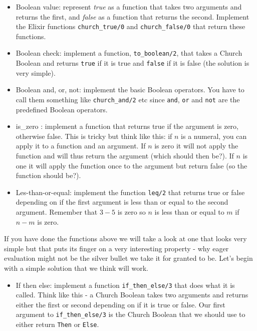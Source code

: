 \documentclass[a4paper,11pt]{article}
\begin{document}
\begin{itemize}

\item Boolean value: represent {\em true} as a function that takes two
  arguments and returns the first, and {\em false} as a function that
  returns the second.  Implement the Elixir functions {\tt church\_true/0} and
  {\tt church\_false/0} that return these functions.
  
\item Boolean check: implement a function, {\tt to\_boolean/2},  that takes a Church Boolean
  and returns {\tt true} if it is true and {\tt false} if it is false
  (the solution is very simple).
  
\item Boolean and, or, not: implement the basic Boolean operators. You have to
  call them something like {\tt church\_and/2} etc since {\tt and},
  {\tt or} and {\tt not} are the predefined Boolean operators.

\item is\_zero : implement a function that returns true if the argument
  is zero, otherwise false. This is tricky but think like this: if $n$
  is a numeral, you can apply it to a function and an argument. If $n$ is
  zero it will not apply the function and will thus return the
  argument (which should then be?). If $n$ is one it will apply the
  function once to the argument but return false (so the function should be?).

\item Les-than-or-equal: implement the function {\tt leq/2} that
  returns true or false depending on if the first argument is less
  than or equal to the second argument. Remember that $3-5$ is zero so
  $n$ is less than or equal to $m$ if $n - m$ is zero.
\end{itemize}

If you have done the functions above we will take a look at one that
looks very simple but that puts its finger on a very interesting
property - why eager evaluation might not be the silver bullet we take
it for granted to be. Let's begin with a simple solution that we think
will work.


\begin{itemize}
\item If then else: implement a function {\tt if\_then\_else/3} that
  does what it is called. Think like this - a Church Boolean takes two
  arguments and returns either the first or second depending on if it
  is true or false. Our first argument to {\tt if\_then\_else/3} is the
  Church Boolean that we should use to either return {\tt Then} or {\tt Else}. 
\end{itemize}
\end{document}
